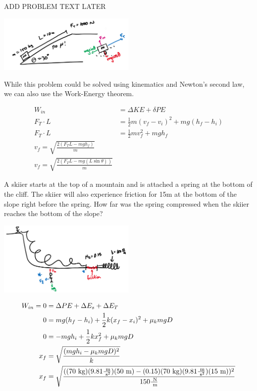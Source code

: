 \begin{problem}
    ADD PROBLEM TEXT LATER

    \begin{center}
        \includegraphics[width=0.5\textwidth]{chapters/ch4/images/fig4_5.PNG}
    \end{center}

    While this problem could be solved using kinematics and Newton's second law, we can also use the Work-Energy theorem. 

    $$
    \begin{aligned}
        W_{in} &= \Delta KE + \delta PE\\
        F_T \cdot L &= \frac{1}{2}m(v_f - v_i)^2 + mg(h_f - h_i)\\
        F_T \cdot L &= \frac{1}{2}mv_f^2 + mgh_f\\
        v_f = \sqrt{\frac{2(F_TL - mgh_f)}{m}}\\
        v_f = \sqrt{\frac{2(F_TL - mg(L\sin\theta))}{m}}
    \end{aligned}
    $$
\end{problem}

\begin{problem}
    A skiier starts at the top of a mountain and is attached a spring at the bottom of the cliff. The skiier will also experience friction for 15m at the bottom of the slope right before the spring. How far was the spring compressed when the skiier reaches the bottom of the slope?

    \begin{center}
        \includegraphics[width=0.5\textwidth]{chapters/ch4/images/fig4_6.PNG}
    \end{center}

    $$
    \begin{aligned}
        W_{in} = 0 &= \Delta PE + \Delta E_s + \Delta E_{T}\\
        0 &= mg(h_f-h_i) + \frac{1}{2}k(x_f-x_i)^2 + \mu_kmgD\\
        0 &= -mgh_i + \frac{1}{2}kx_f^2 + \mu_kmgD\\
        x_f &= \sqrt{\frac{(mgh_i-\mu_kmgD)^2}{k}}\\
        x_f &= \sqrt{\frac{((70\text{ kg})(9.81\frac{\text{ m}}{\text{ s}^2})(50\text{ m})-(0.15)(70\text{ kg})(9.81\frac{\text{ m}}{\text{ s}^2})(15\text{ m}))^2}{150 \frac{\text{ N}}{\text{ m}}}}\\
    \end{aligned}
    $$
\end{problem}


